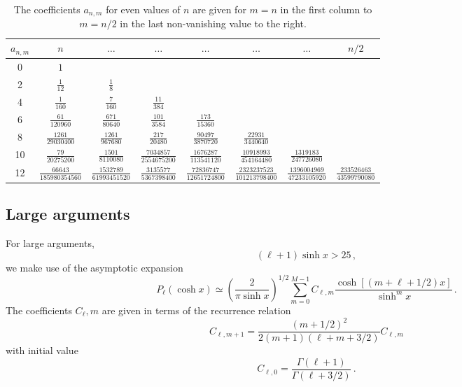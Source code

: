 \documentclass[onecolumn%
              ,superscriptaddress%
              ,aps%
              ,pra]{revtex4}
\begin{document}
\begin{table}
{\def\arraystretch{1.5}\tabcolsep=6pt
\begin{tabular}{|c|c|c|c|c|c|c|c|}
\hline
$a_{n,m}$ & $n$ & $\dots$ &$\dots$&$\dots$&$\dots$&$\dots$& $n/2$ \\\hline
0 & $1$ & & & & & &\\\hline
2 & $\frac{1}{12}$ & $\frac{1}{8}$ & & & & &\\\hline
4 &$\frac{1}{160}$ & $\frac{7}{160}$ & $\frac{11}{384}$ & & & &\\\hline
6 & $\frac{61}{120960}$ & $\frac{671}{80640}$ & $\frac{101}{3584}$ & $\frac{173}{15360}$ & & &\\\hline
8 & $\frac{1261}{29030400}$ & $\frac{1261}{967680}$ & $\frac{217}{20480}$ & $\frac{90497}{3870720}$ & $\frac{22931}{3440640}$ & & \\\hline
10 & $\frac{79}{20275200}$ & $\frac{1501}{8110080}$ & $\frac{7034857}{2554675200}$ & $\frac{1676287}{113541120}$ & $\frac{10918993}{454164480}$ & $\frac{1319183}{247726080}$ & \\\hline
12 & $\frac{66643}{185980354560}$ & $\frac{1532789}{61993451520}$ & $\frac{3135577}{5367398400}$ & $\frac{72836747}{12651724800}$ & $\frac{2323237523}{101213798400}$ & $\frac{1396004969}{47233105920}$ & $\frac{233526463}{43599790080}$\\\hline
\end{tabular}
}
\caption{The coefficients $a_{n,m}$ for even values of $n$ are given for $m=n$ in the first column to $m=n/2$ in the last non-vanishing value to the right.}
\label{table:a_nm}
\end{table}

\subsection{Large arguments}
For large arguments,
\begin{equation}
(\ell+1)\sinh x > 25\,,
\end{equation}
we make use of the asymptotic expansion
\begin{equation}
P_\ell (\cosh x) \simeq \left(\frac{2}{\pi \sinh x}\right)^{1/2} \sum_{m=0}^{M-1} C_{\ell,m} \frac{\cosh[(m+\ell+1/2)x]}{\sinh^m x}\,.
\end{equation}
The coefficients $C_\ell,m$ are given in terms of the recurrence relation
\begin{equation}
C_{\ell,m+1} = \frac{(m+1/2)^2}{2(m+1)(\ell+m+3/2)} C_{\ell,m}
\end{equation}
with initial value
\begin{equation}
C_{\ell,0} = \frac{\Gamma(\ell+1)}{\Gamma(\ell+3/2)}\,.
\end{equation}
\end{document}
